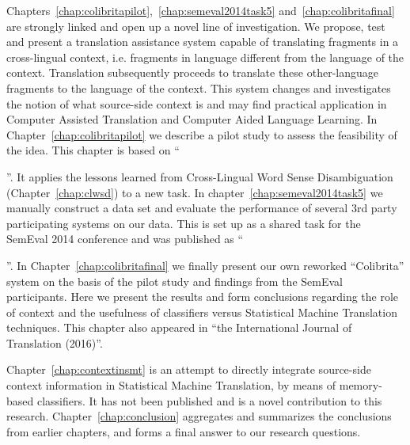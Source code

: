{Chapters~\ref{chap:colibritapilot},~\ref{chap:semeval2014task5}
and~\ref{chap:colibritafinal} are strongly linked and open up a novel line of
investigation. We propose, test and present a translation assistance system
capable of translating fragments in a cross-lingual context, i.e. fragments in
language different from the language of the context. Translation subsequently
proceeds to translate these other-language fragments to the language of the context.
This system changes and investigates the notion of what source-side context is and may
find practical application in Computer Assisted Translation and Computer Aided
Language Learning. In Chapter~\ref{chap:colibritapilot} we describe a pilot study to
assess the feasibility of the idea. This chapter is based on
``{\footnotesize\begin{NoHyper}\end{NoHyper}}''. It applies the lessons learned from
Cross-Lingual Word Sense Disambiguation (Chapter~\ref{chap:clwsd}) to a new
task.  In chapter~\ref{chap:semeval2014task5} we
manually construct a data set and evaluate
the performance of several 3rd party participating systems on our data. This is set up as a shared task for the SemEval
2014 conference and was published as ``{\footnotesize\begin{NoHyper}\end{NoHyper}}''.
 In Chapter~\ref{chap:colibritafinal} we finally present our own reworked
``Colibrita'' system on the basis of the pilot study and findings from the
SemEval participants. Here we present the results and form conclusions
regarding the role of context and the usefulness of classifiers versus
Statistical Machine Translation techniques. This chapter also appeared in ``{\footnotesize the International Journal of Translation
(2016)}''.

Chapter~\ref{chap:contextinsmt} is an attempt to directly integrate source-side
context information in Statistical Machine Translation, by means of
memory-based classifiers. It has not been published and is a novel contribution to this research. Chapter~\ref{chap:conclusion} aggregates and
summarizes the conclusions from earlier chapters, and forms a final answer to
our research questions.
}
